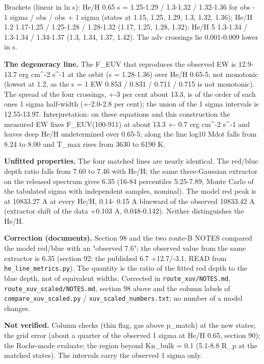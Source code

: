 \documentclass[english,a4paper]{my_memo}
\begin{document}
Brackets (linear in ln s): He/H 0.65 s = 1.25-1.29 / 1.3-1.32 / 1.32-1.36
for obs - 1 sigma / obs / obs + 1 sigma (states at 1.15, 1.25, 1.29, 1.3,
1.32, 1.36); He/H 1.2 1.17-1.25 / 1.25-1.28 / 1.28-1.32 (1.17, 1.25, 1.28,
1.32); He/H 5 1.3-1.34 / 1.3-1.34 / 1.34-1.37 (1.3, 1.34, 1.37, 1.42). The
adv crossings lie 0.001-0.009 lower in s.

\textbf{The degeneracy line.} The F\_EUV that reproduces the observed EW is
12.9-13.7 erg cm\^{}-2 s\^{}-1 at the orbit (s = 1.28-1.36) over He/H 0.65-5, not
monotonic (lowest at 1.2, as the s = 1 EW 0.853 / 0.831 / 0.711 / 0.715 is
not monotonic). The spread of the four crossings, +-3 per cent about 13.3,
is of the order of each one\textquotesingle s 1 sigma half-width (+-2.0-2.8 per cent); the
union of the 1 sigma intervals is 12.55-13.97. Interpretation: on these
equations and this construction the measured EW fixes F\_EUV(100-911) at
about 13.3 +- 0.7 erg cm\^{}-2 s\^{}-1 and leaves deep He/H undetermined over
0.65-5; along the line log10 Mdot falls from 8.24 to 8.00 and T\_max rises
from 3630 to 6190 K.

\textbf{Unfitted properties.} The four matched lines are nearly identical. The
red/blue depth ratio falls from 7.60 to 7.46 with He/H; the same
three-Gaussian extractor on the released spectrum gives 6.35 (16-84
percentiles 5.25-7.89, Monte Carlo of the tabulated sigma with independent
samples, nominal). The model red peak is at 10833.27 A at every He/H, 0.14-
0.15 A blueward of the observed 10833.42 A (extractor shift of the data
+0.103 A, 0.048-0.142). Neither distinguishes the He/H.

\textbf{Correction (documents).} Section 98 and the two route-B NOTES
compared the model red/blue with an "observed 7.6"; the observed value from
the same extractor is 6.35 (section 92; the published 6.7 +12.7/-3.1, READ
from \texttt{he\_line\_metrics.py}). The quantity is the ratio of the fitted red
depth to the blue depth, not of equivalent widths. Corrected in
\texttt{route\_xuv/NOTES.md}, \texttt{route\_xuv\_scaled/NOTES.md}, section 98 above and
the column labels of \texttt{compare\_xuv\_scaled.py} / \texttt{xuv\_scaled\_numbers.txt};
no number of a model changes.

\textbf{Not verified.} Column checks (thin flag, gas above p\_match) at the new
states; the grid error (about a quarter of the observed 1 sigma at He/H
0.65, section 90); the Roche-mode evaluate; the region beyond Kn\_bulk = 0.1
(5.1-8.8 R\_p at the matched states). The intervals carry the observed
1 sigma only.
\end{document}

